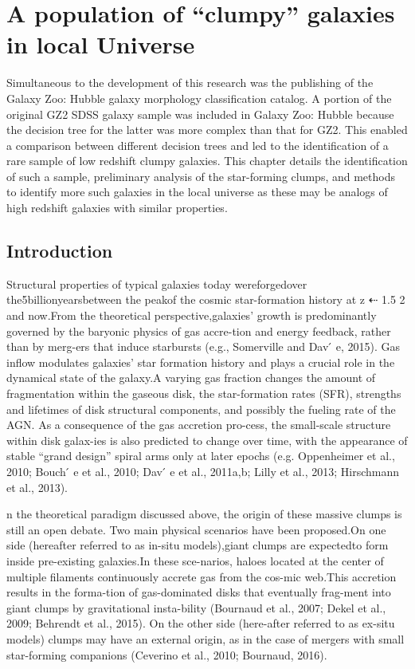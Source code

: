
\chapter{A population of ``clumpy'' galaxies in local Universe}\label{chap:5}
Simultaneous to the development of this research was the publishing of the Galaxy Zoo: Hubble galaxy morphology classification catalog. A portion of the original GZ2 SDSS galaxy sample was included in Galaxy Zoo: Hubble because the decision tree for the latter was more complex than that for GZ2. This enabled a comparison between different decision trees and led to the identification of a rare sample of low redshift clumpy galaxies. This chapter details the identification of such a sample, preliminary analysis of the star-forming clumps, and methods to identify more such galaxies in the local universe as these may be analogs of high redshift galaxies with similar properties.

\section{Introduction}
Structural properties of typical galaxies today wereforgedover the5billionyearsbetween the peakof the cosmic star-formation history at z ⇠ 1.5  2 and now.From the theoretical perspective,galaxies’ growth is predominantly governed by the baryonic physics of gas accre-tion and energy feedback, rather than by merg-ers that induce starbursts (e.g., Somerville and Dav ́ e, 2015). Gas inflow modulates galaxies’ star formation history and plays a crucial role in the dynamical state of the galaxy.A varying gas fraction changes the amount of fragmentation within the gaseous disk, the star-formation rates (SFR), strengths and lifetimes of disk structural components, and possibly the fueling rate of the AGN. As a consequence of the gas accretion pro-cess, the small-scale structure within disk galax-ies is also predicted to change over time, with the appearance of stable “grand design” spiral arms only at later epochs (e.g. Oppenheimer et al., 2010; Bouch ́ e et al., 2010; Dav ́ e et al., 2011a,b; Lilly et al., 2013; Hirschmann et al., 2013). 

n the theoretical paradigm discussed above, the origin of these massive clumps is still an open debate. Two main physical scenarios have been proposed.On one side (hereafter referred to as in-situ models),giant clumps are expectedto form inside pre-existing galaxies.In these sce-narios, haloes located at the center of multiple filaments continuously accrete gas from the cos-mic web.This accretion results in the forma-tion of gas-dominated disks that eventually frag-ment into giant clumps by gravitational insta-bility (Bournaud et al., 2007; Dekel et al., 2009; Behrendt et al., 2015). On the other side (here-after referred to as ex-situ models) clumps may have an external origin, as in the case of mergers with small star-forming companions (Ceverino et al., 2010; Bournaud, 2016). 

